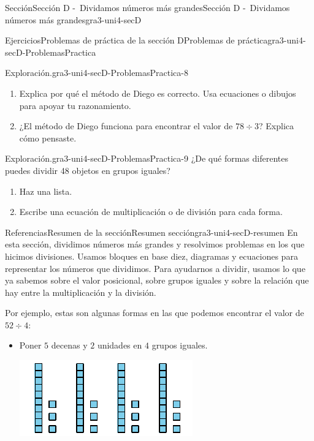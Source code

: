 \documentclass[twoside,10pt,]{article}
\begin{document}
\begin{sectionptx}{Sección}{Sección D -~Dividamos números más grandes}{}{Sección D -~Dividamos números más grandes}{}{}{gra3-uni4-secD}
\begin{exercises-subsection}{Ejercicios}{Problemas de práctica de la sección D}{}{Problemas de práctica}{}{}{gra3-uni4-secD-ProblemasPractica}
\begin{divisionexercise}{6}{Exploración.}{}{gra3-uni4-secD-ProblemasPractica-8}
\begin{enumerate}[label=(\alph*)]
\item{}Explica por qué el método de Diego es correcto. Usa ecuaciones o dibujos para apoyar tu razonamiento.%
\item{}¿El método de Diego funciona para encontrar el valor de \(78 \div 3\)?%
 Explica cómo pensaste.\end{enumerate}
\end{divisionexercise}%
\begin{divisionexercise}{7}{Exploración.}{}{gra3-uni4-secD-ProblemasPractica-9}%
¿De qué formas diferentes puedes dividir 48 objetos en grupos iguales?%
%
\begin{enumerate}[label=(\alph*)]
\item{}Haz una lista.%
\item{}Escribe una ecuación de multiplicación o de división para cada forma.%
\end{enumerate}
\end{divisionexercise}%
\end{exercises-subsection}
%
%
\typeout{************************************************}
\typeout{************************************************}
%
\begin{references-subsection}{Referencias}{Resumen de la sección}{}{Resumen sección}{}{}{gra3-uni4-secD-resumen}
En esta sección, dividimos números más grandes y resolvimos problemas en los que hicimos divisiones. Usamos bloques en base diez, diagramas y ecuaciones para representar los números que dividimos. Para ayudarnos a dividir, usamos lo que ya sabemos sobre el valor posicional, sobre grupos iguales y sobre la relación que hay entre la multiplicación y la división.%
\par
Por ejemplo, estas son algunas formas en las que podemos encontrar el valor de \(52 \div 4\):%
%
\begin{itemize}[label=\textbullet]
\item{}Poner \(5\) decenas y \(2\) unidades en \(4\) grupos iguales.%
\begin{image}{0}{1}{0}{}%
\includegraphics[width=\linewidth]{external/svg-source/tikz-file-147697.pdf}

\end{image}
\end{itemize}
\end{references-subsection}
\end{sectionptx}
\end{document}
